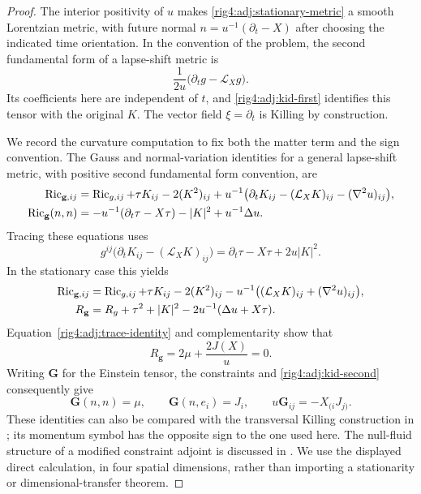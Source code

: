 \begin{proof}
The interior positivity of $u$ makes \eqref{rig4:adj:stationary-metric} a smooth
Lorentzian metric, with future normal $n=u^{-1}(\partial_t-X)$ after choosing
the indicated time orientation.  In the convention of the problem, the
second fundamental form of a lapse-shift metric is
\[
 \frac1{2u}\bigl(\partial_tg-\mathcal L_Xg\bigr).
\]
Its coefficients here are independent of $t$, and
\eqref{rig4:adj:kid-first} identifies this tensor with the original $K$.
The vector field $\xi=\partial_t$ is Killing by construction.

We record the curvature computation to fix both the matter term and the
sign convention.  The Gauss and normal-variation identities for a general
lapse-shift metric, with positive second fundamental form convention, are
\begin{align*}
 \operatorname{Ric}_{\mathbf g,ij}
  &=\operatorname{Ric}_{g,ij}+\tau K_{ij}-2(K^2)_{ij}
    +u^{-1}\bigl(\partial_tK_{ij}
           -(\mathcal L_XK)_{ij}-(\nabla^2u)_{ij}\bigr),\\
 \operatorname{Ric}_{\mathbf g}(n,n)
  &=-u^{-1}(\partial_t\tau-X\tau)-|K|^2+u^{-1}\Delta u.
\end{align*}
Tracing these equations uses
\[
 g^{ij}\bigl(\partial_tK_{ij}-(\mathcal L_XK)_{ij}\bigr)
 =\partial_t\tau-X\tau+2u|K|^2.
\]
In the stationary case this yields
\begin{align}
 \operatorname{Ric}_{\mathbf g,ij}
 &=\operatorname{Ric}_{g,ij}+\tau K_{ij}-2(K^2)_{ij}
      -u^{-1}\bigl((\mathcal L_XK)_{ij}+(\nabla^2u)_{ij}\bigr),
 \label{rig4:adj:spatial-ricci}\\
 R_{\mathbf g}
 &=R_g+\tau^2+|K|^2-2u^{-1}(\Delta u+X\tau).
 \label{rig4:adj:spacetime-scalar}
\end{align}
Equation~\eqref{rig4:adj:trace-identity} and complementarity show that
\[
 R_{\mathbf g}=2\mu+\frac{2J(X)}u=0.
\]
Writing $\mathbf G$ for the Einstein tensor, the constraints and
\eqref{rig4:adj:kid-second} consequently give
\begin{equation}
 \mathbf G(n,n)=\mu,\qquad
 \mathbf G(n,e_i)=J_i,\qquad
 u\mathbf G_{ij}=-X_{(i}J_{j)}.
 \label{rig4:adj:einstein-components}
\end{equation}
These identities can also be compared with the transversal Killing
construction in \cite{BeigChrusciel1997KID}; its momentum symbol has the
opposite sign to the one used here.  The null-fluid structure of a modified
constraint adjoint is discussed in \cite[Section~6.1]{HuangLee2024Bartnik}.
We use the displayed direct calculation, in four spatial dimensions, rather
than importing a stationarity or dimensional-transfer theorem.


\end{proof}
